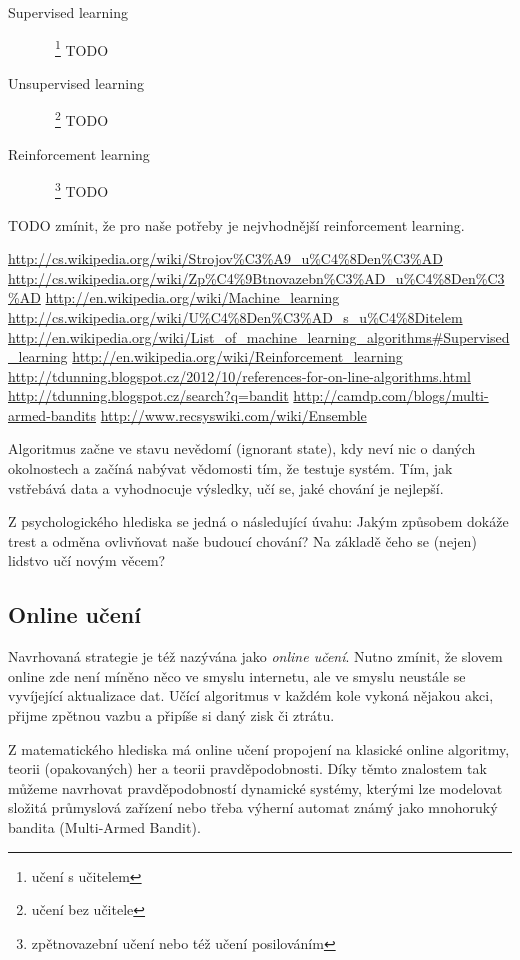 \documentclass[thesis=M,czech]{FITthesis}[2014/05/07]
\begin{document}
\begin{description}
  \item[Supervised learning]~\footnote{učení s učitelem} TODO
  \item[Unsupervised learning]~\footnote{učení bez učitele} TODO
  \item[Reinforcement learning]~\footnote{zpětnovazební učení nebo též učení posilováním} TODO
\end{description}

TODO zmínit, že pro naše potřeby je nejvhodnější reinforcement learning.

\url{http://cs.wikipedia.org/wiki/Strojov%C3%A9_u%C4%8Den%C3%AD}
\url{http://cs.wikipedia.org/wiki/Zp%C4%9Btnovazebn%C3%AD_u%C4%8Den%C3%AD}
\url{http://en.wikipedia.org/wiki/Machine_learning}
\url{http://cs.wikipedia.org/wiki/U%C4%8Den%C3%AD_s_u%C4%8Ditelem}
\url{http://en.wikipedia.org/wiki/List_of_machine_learning_algorithms#Supervised_learning}
\url{http://en.wikipedia.org/wiki/Reinforcement_learning}
\url{http://tdunning.blogspot.cz/2012/10/references-for-on-line-algorithms.html}
\url{http://tdunning.blogspot.cz/search?q=bandit}
\url{http://camdp.com/blogs/multi-armed-bandits}
\url{http://www.recsyswiki.com/wiki/Ensemble}

Algoritmus začne ve stavu nevědomí (ignorant state), kdy neví nic o daných okolnostech a začíná nabývat vědomosti tím, že testuje systém. Tím, jak vstřebává data a vyhodnocuje výsledky, učí se, jaké chování je nejlepší.

Z psychologického hlediska se jedná o následující úvahu: Jakým způsobem dokáže trest a odměna ovlivňovat naše budoucí chování? Na základě čeho se (nejen) lidstvo učí novým věcem?

\subsection{Online učení}

Navrhovaná strategie je též nazývána jako \emph{online učení}. Nutno zmínit, že slovem online zde není míněno něco ve smyslu internetu, ale ve smyslu neustále se vyvíjející aktualizace dat. Učící algoritmus v každém kole vykoná nějakou akci, přijme zpětnou vazbu a připíše si daný zisk či ztrátu.

Z matematického hlediska má online učení propojení na klasické online algoritmy, teorii (opakovaných) her a teorii pravděpodobnosti. Díky těmto znalostem tak můžeme navrhovat pravděpodobností dynamické systémy, kterými lze modelovat složitá průmyslová zařízení nebo třeba výherní automat známý jako mnohoruký bandita (Multi-Armed Bandit).
\end{document}
